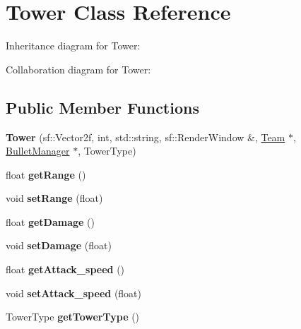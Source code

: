 \hypertarget{class_tower}{\section{Tower Class Reference}
\label{class_tower}
}


Inheritance diagram for Tower\+:


Collaboration diagram for Tower\+:
\subsection*{Public Member Functions}
\begin{DoxyCompactItemize}
\item 
\hypertarget{class_tower_a45597a8e029390c5d299dcd2609de661}{{\bfseries Tower} (sf\+::\+Vector2f, int, std\+::string, sf\+::\+Render\+Window \&, \hyperlink{class_team}{Team} $\ast$, \hyperlink{class_bullet_manager}{Bullet\+Manager} $\ast$, Tower\+Type)}\label{class_tower_a45597a8e029390c5d299dcd2609de661}

\item 
\hypertarget{class_tower_abbb4fe2239e90f18095e79680dbfd63c}{float {\bfseries get\+Range} ()}\label{class_tower_abbb4fe2239e90f18095e79680dbfd63c}

\item 
\hypertarget{class_tower_a6bda114294794fe408f8d41a7ad1e04c}{void {\bfseries set\+Range} (float)}\label{class_tower_a6bda114294794fe408f8d41a7ad1e04c}

\item 
\hypertarget{class_tower_acdcf79c9b6c65a9e5134ec249bf6bd4a}{float {\bfseries get\+Damage} ()}\label{class_tower_acdcf79c9b6c65a9e5134ec249bf6bd4a}

\item 
\hypertarget{class_tower_a67cd780ef4c19e9eb3ca07b8e1937597}{void {\bfseries set\+Damage} (float)}\label{class_tower_a67cd780ef4c19e9eb3ca07b8e1937597}

\item 
\hypertarget{class_tower_a8010e7ecd79c9922302cbd8b821da07f}{float {\bfseries get\+Attack\+\_\+speed} ()}\label{class_tower_a8010e7ecd79c9922302cbd8b821da07f}

\item 
\hypertarget{class_tower_af0f905570a024bace2e85569b2560a98}{void {\bfseries set\+Attack\+\_\+speed} (float)}\label{class_tower_af0f905570a024bace2e85569b2560a98}

\item 
\hypertarget{class_tower_a84b2404a3173a459f67d7769c5c42f46}{Tower\+Type {\bfseries get\+Tower\+Type} ()}\label{class_tower_a84b2404a3173a459f67d7769c5c42f46}


\end{DoxyCompactItemize}
